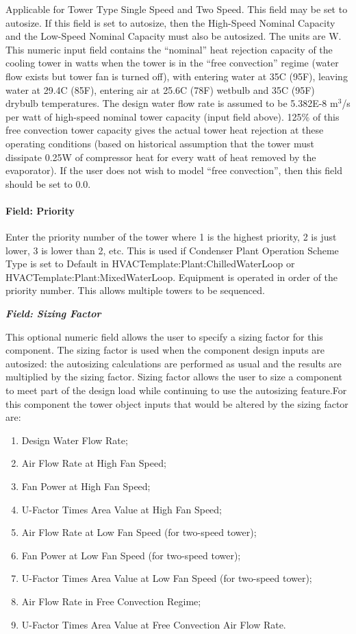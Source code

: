 Applicable for Tower Type Single Speed and Two Speed. This field may be set to autosize. If this field is set to autosize, then the High-Speed Nominal Capacity and the Low-Speed Nominal Capacity must also be autosized. The units are W. This numeric input field contains the ``nominal'' heat rejection capacity of the cooling tower in watts when the tower is in the ``free convection'' regime (water flow exists but tower fan is turned off), with entering water at 35C (95F), leaving water at 29.4C (85F), entering air at 25.6C (78F) wetbulb and 35C (95F) drybulb temperatures. The design water flow rate is assumed to be 5.382E-8 m\(^{3}\)/s per watt of high-speed nominal tower capacity (input field above). 125\% of this free convection tower capacity gives the actual tower heat rejection at these operating conditions (based on historical assumption that the tower must dissipate 0.25W of compressor heat for every watt of heat removed by the evaporator). If the user does not wish to model ``free convection'', then this field should be set to 0.0.

\paragraph{Field: Priority}\label{field-priority-2}

Enter the priority number of the tower where 1 is the highest priority, 2 is just lower, 3 is lower than 2, etc. This is used if Condenser Plant Operation Scheme Type is set to Default in HVACTemplate:Plant:ChilledWaterLoop or HVACTemplate:Plant:MixedWaterLoop. Equipment is operated in order of the priority number. This allows multiple towers to be sequenced.

\textbf{\emph{Field: Sizing Factor}}

This optional numeric field allows the user to specify a sizing factor for this component. The sizing factor is used when the component design inputs are autosized: the autosizing calculations are performed as usual and the results are multiplied by the sizing factor. Sizing factor allows the user to size a component to meet part of the design load while continuing to use the autosizing feature.For this component the tower object inputs that would be altered by the sizing factor are:

\begin{enumerate}
\def\labelenumi{\arabic{enumi}.}
\item
  Design Water Flow Rate;
\item
  Air Flow Rate at High Fan Speed;
\item
  Fan Power at High Fan Speed;
\item
  U-Factor Times Area Value at High Fan Speed;
\item
  Air Flow Rate at Low Fan Speed (for two-speed tower);
\item
  Fan Power at Low Fan Speed (for two-speed tower);
\item
  U-Factor Times Area Value at Low Fan Speed (for two-speed tower);
\item
  Air Flow Rate in Free Convection Regime;
\item
  U-Factor Times Area Value at Free Convection Air Flow Rate.
\end{enumerate}


